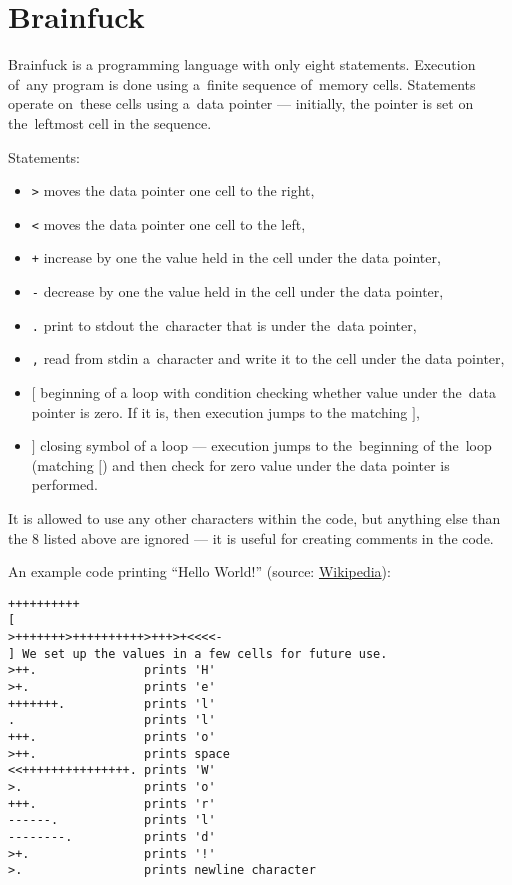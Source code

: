 \documentclass[english,shortabstract,mgr]{iithesis}
\begin{document}
\section {Brainfuck}

Brainfuck is a programming language with only eight statements. Execution
of~any program is done using a~finite sequence of~memory cells. Statements
operate on~these cells using a~data pointer --- initially, the pointer is set
on the~leftmost cell in the sequence.

Statements:
\begin{itemize}
  \item \texttt{>} moves the data pointer one cell to the right,
  \item \texttt{<} moves the data pointer one cell to the left,
  \item \texttt{+} increase by one the value held in the cell under the data pointer,
  \item \texttt{-} decrease by one the value held in the cell under the data pointer,
  \item \texttt{.} print to stdout the~character that is under the~data pointer,
  \item \texttt{,} read from stdin a~character and write it to the cell under the data pointer,
  \item \texttt{$[$} beginning of a loop with condition checking whether value under
      the~data pointer is zero. If it is, then execution jumps to the matching $]$,
  \item \texttt{$]$} closing symbol of a loop --- execution jumps to the~beginning of the~loop
      (matching $[$) and then check for zero value under the data pointer is performed.
\end{itemize}

It is allowed to use any other characters within the code, but anything else than the $8$
listed above are ignored --- it is useful for creating comments in the code.

An example code printing ``Hello World!'' (source: \href{https://pl.wikipedia.org/wiki/Brainfuck#Przyk%C5%82ady}{Wikipedia}):
\begin{verbatim}
++++++++++
[
>+++++++>++++++++++>+++>+<<<<-
] We set up the values in a few cells for future use.
>++.               prints 'H'
>+.                prints 'e'
+++++++.           prints 'l'
.                  prints 'l'
+++.               prints 'o'
>++.               prints space
<<+++++++++++++++. prints 'W'
>.                 prints 'o'
+++.               prints 'r'
------.            prints 'l'
--------.          prints 'd'
>+.                prints '!'
>.                 prints newline character
\end{verbatim}
\end{document}
